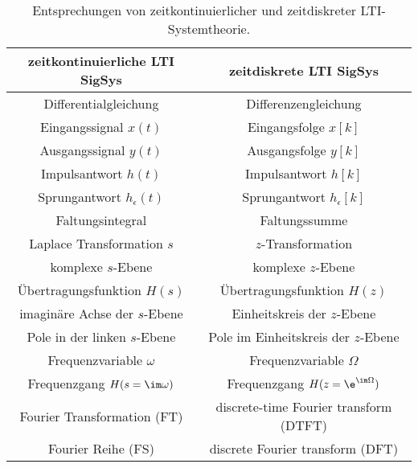 \begin{table}[t]
\begin{center}
\begin{tabular}{ | c | c | }
\hline
zeitkontinuierliche LTI SigSys & zeitdiskrete LTI SigSys\\\hline
Differentialgleichung & Differenzengleichung \\
Eingangssignal $x(t)$ & Eingangsfolge $x[k]$ \\
Ausgangssignal $y(t)$ & Ausgangsfolge $y[k]$ \\
Impulsantwort $h(t)$ & Impulsantwort $h[k]$ \\
Sprungantwort $h_\epsilon(t)$ & Sprungantwort $h_\epsilon[k]$ \\
Faltungsintegral & Faltungssumme \\
Laplace Transformation $s$ & $z$-Transformation \\
komplexe $s$-Ebene & komplexe $z$-Ebene\\
Übertragungsfunktion $H(s)$ & Übertragungsfunktion $H(z)$ \\
imaginäre Achse der $s$-Ebene & Einheitskreis der $z$-Ebene\\
Pole in der linken $s$-Ebene &
Pole im Einheitskreis der $z$-Ebene \\
Frequenzvariable $\omega$ & Frequenzvariable $\Omega$ \\
Frequenzgang $H(s=\im\omega)$ & Frequenzgang $H(z=\e^{\im\Omega})$ \\
Fourier Transformation (FT)  & discrete-time Fourier transform (DTFT)\\
Fourier Reihe (FS)  & discrete Fourier transform (DFT) \\\hline
\end{tabular}
\end{center}
\caption{Entsprechungen von zeitkontinuierlicher und zeitdiskreter LTI-Systemtheorie.}
\label{tbl:Analogien_CT_DT}
\end{table}









